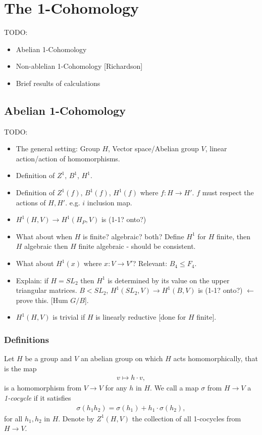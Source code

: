 
\chapter{The 1-Cohomology}
\label{Chapter4}

TODO:
\begin{itemize}
\item Abelian 1-Cohomology
\item Non-ablelian 1-Cohomology [Richardson]
\item Brief results of calculations
\end{itemize}

\section{Abelian 1-Cohomology}
TODO:
	\begin{itemize}
	\item The general setting: Group $H$, Vector space/Abelian group $V$, linear action/action of homomorphisms.
	\item Definition of $Z^1$, $B^1$, $H^1$.
	\item Definition of $Z^1(f)$, $B^1(f)$, $H^1(f)$ where $f:H\rightarrow H'$. $f$ must respect the actions of $H, H'$.
	e.g. $i$ inclusion map.
	\item $H^1(H, V) \rightarrow H^1(H_P, V)$ is (1-1? onto?)
	\item What about when $H$ is finite? algebraic? both?
	Define $H^1$ for $H$ finite, then $H$ algebraic then $H$ finite algebraic - should be consistent.
	\item What about $H^1(x)$ where $x:V\rightarrow V'$?
	Relevant: $B_4 \leq F_4$.
	\item Explain: if $H=SL_2$ then $H^1$ is determined by its value on the upper triangular matrices. 
	$B < SL_2$, $H^1(SL_2, V)\rightarrow H^1(B, V)$ is (1-1? onto?) $\leftarrow$ prove this. [Hum $G/B$].
	\item $H^1(H, V)$ is trivial if $H$ is linearly reductive [done for $H$ finite].
	\end{itemize}
	
\subsection{Definitions}
Let $H$ be a group and $V$ an abelian group on which $H$ acts homomorphically, that is the map
\begin{eqnarray*}
	v \mapsto h\cdot v,
\end{eqnarray*}
is a homomorphism from $V\rightarrow V$ for any $h$ in $H$. We call a map $\sigma$ from $H\rightarrow V$ a  \emph{1-cocycle} if it satisfies
\begin{eqnarray}\label{ch4::theOneCocycleCondition}
	\sigma(h_1h_2) = \sigma(h_1) + h_1\cdot\sigma(h_2),
\end{eqnarray}
for all $h_1, h_2$ in $H$. Denote by $Z^1\left( H, V \right)$ the collection of all 1-cocycles from $H\rightarrow V$.

